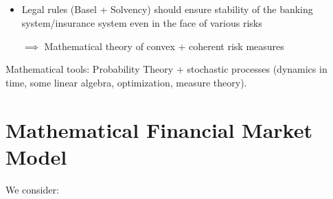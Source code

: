 \subsection*{}
\begin{itemize}
	
	\item Legal rules (Basel + Solvency) should ensure stability of the banking system/insurance system even in the face of various risks 
	
	$\implies$ Mathematical theory of convex + coherent risk measures 
\end{itemize}	 
Mathematical tools: Probability Theory + stochastic processes (dynamics in time, some linear algebra, optimization, measure theory).

\section{Mathematical Financial Market Model}
We consider:
